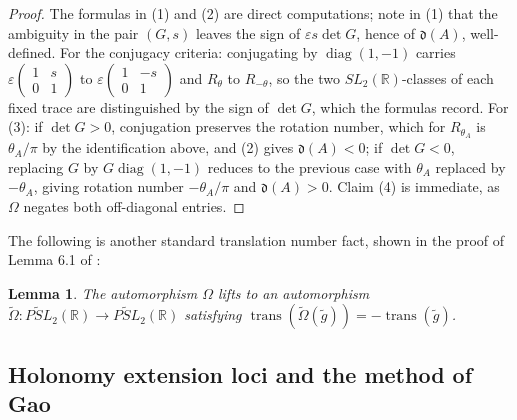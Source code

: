 \documentclass{article}
\theoremstyle{plain}
\theoremstyle{definition}
\theoremstyle{plain}
\theoremstyle{plain}
\theoremstyle{plain}
\newtheorem{lemma}[theorem]{Lemma}
\theoremstyle{remark}
\theoremstyle{remark}
\theoremstyle{plain}
\theoremstyle{plain}
\theoremstyle{plain}
\theoremstyle{plain}
\begin{document}
\begin{proof}
The formulas in (1) and (2) are direct computations; note in (1) that the ambiguity in the pair $(G, s)$ leaves the sign of $\varepsilon s \det G$, hence of $\mathfrak{d}(A)$, well-defined. For the conjugacy criteria: conjugating by $\operatorname{diag}(1,-1)$ carries $\varepsilon\left(\begin{smallmatrix}1&s\\0&1\end{smallmatrix}\right)$ to $\varepsilon\left(\begin{smallmatrix}1&-s\\0&1\end{smallmatrix}\right)$ and $R_\theta$ to $R_{-\theta}$, so the two $SL_2(\mathbb{R})$-classes of each fixed trace are distinguished by the sign of $\det G$, which the formulas record. For (3): if $\det G > 0$, conjugation preserves the rotation number, which for $R_{\theta_A}$ is $\theta_A/\pi$ by the identification above, and (2) gives $\mathfrak{d}(A) < 0$; if $\det G < 0$, replacing $G$ by $G\operatorname{diag}(1,-1)$ reduces to the previous case with $\theta_A$ replaced by $-\theta_A$, giving rotation number $-\theta_A/\pi$ and $\mathfrak{d}(A) > 0$. Claim (4) is immediate, as $\Omega$ negates both off-diagonal entries.
\end{proof}

The following is another standard translation number fact, shown in the proof of Lemma 6.1 of \cite{cullerdunfield}:

\begin{lemma}\label{lma:outerreverses}
The automorphism $\Omega$ lifts to an automorphism $\widetilde\Omega: \widetilde{PSL}_2(\mathbb R) \to \widetilde{PSL}_2(\mathbb R)$ satisfying $\operatorname{trans}(\widetilde\Omega(\widetilde g)) = -\operatorname{trans}(\widetilde g)$.
\end{lemma}

\subsection{Holonomy extension loci and the method of Gao}
\end{document}
